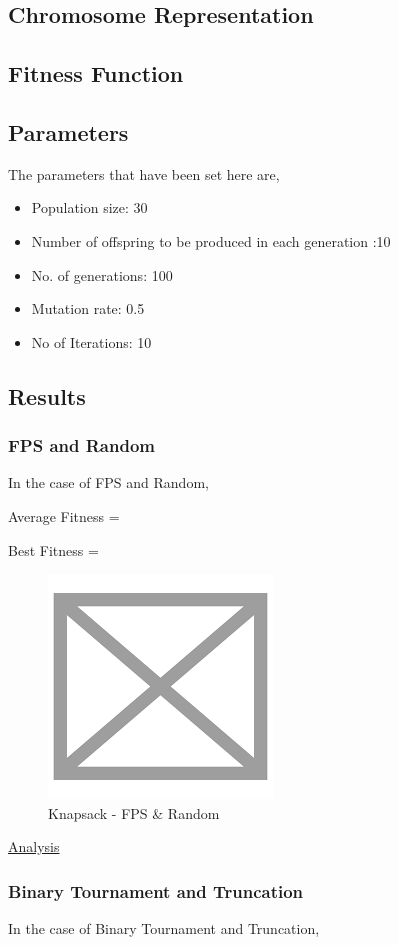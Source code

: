 \documentclass[11pt, letterpaper]{article}
\begin{document}
\subsection{Chromosome Representation}

\subsection{Fitness Function}
\subsection{Parameters}
The parameters that have been set here are,
\begin{itemize}
    \item Population size: 30
    \item Number of offspring to be produced in each generation :10
    \item No. of generations: 100
    \item Mutation rate: 0.5
    \item No of Iterations: 10
\end{itemize}
\subsection{Results} 
\subsubsection {FPS and Random}
In the case of FPS and Random,

Average Fitness = 

Best Fitness = 
\begin{figure}[H]
    \centering
    \includegraphics[scale = 0.6]{images/placeHolder.png}
    \caption {Knapsack - FPS \& Random}
    \label {fig:tpsFR}
\end{figure}
\underline{Analysis}
\subsubsection {Binary Tournament and Truncation}
In the case of Binary Tournament and Truncation,
\end{document}
